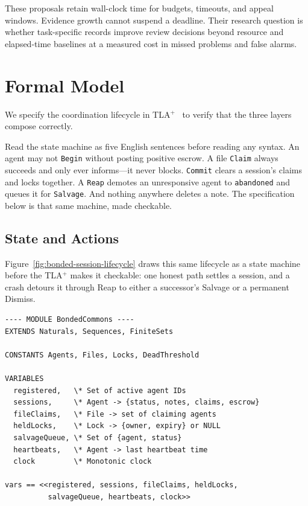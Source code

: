 \documentclass[11pt,a4paper]{article}
\theoremstyle{definition}
\theoremstyle{remark}
\begin{document}
These proposals retain wall-clock time for budgets, timeouts, and appeal
windows. Evidence growth cannot suspend a deadline. Their research question is
whether task-specific records improve review decisions beyond resource and
elapsed-time baselines at a measured cost in missed problems and false alarms.

\section{Formal Model}\label{sec:tlaplus}

We specify the coordination lifecycle in TLA$^{+}$~ to verify that the three layers compose correctly.

Read the state machine as five English sentences before reading any syntax. An agent may not \texttt{Begin} without posting positive escrow. A file \texttt{Claim} always succeeds and only ever informs---it never blocks. \texttt{Commit} clears a session's claims and locks together. A \texttt{Reap} demotes an unresponsive agent to \texttt{abandoned} and queues it for \texttt{Salvage}. And nothing anywhere deletes a note. The specification below is that same machine, made checkable.

\subsection{State and Actions}

Figure~\ref{fig:bonded-session-lifecycle} draws this same lifecycle as a state machine before the TLA$^{+}$ makes it checkable: one honest path settles a session, and a crash detours it through Reap to either a successor's Salvage or a permanent Dismiss.



\begin{lstlisting}[style=tlaplus, caption={TLA$^{+}$: State Variables}]
---- MODULE BondedCommons ----
EXTENDS Naturals, Sequences, FiniteSets

CONSTANTS Agents, Files, Locks, DeadThreshold

VARIABLES
  registered,   \* Set of active agent IDs
  sessions,     \* Agent -> {status, notes, claims, escrow}
  fileClaims,   \* File -> set of claiming agents
  heldLocks,    \* Lock -> {owner, expiry} or NULL
  salvageQueue, \* Set of {agent, status}
  heartbeats,   \* Agent -> last heartbeat time
  clock         \* Monotonic clock

vars == <<registered, sessions, fileClaims, heldLocks,
          salvageQueue, heartbeats, clock>>
\end{lstlisting}
\end{document}
